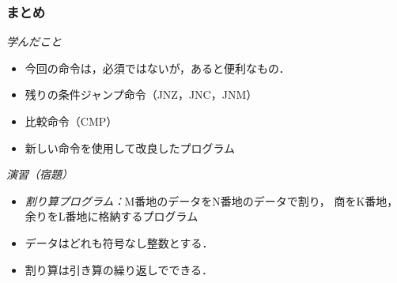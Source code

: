 \documentclass[handout]{beamer}        %
\begin{document}
\begin{frame}
  \frametitle{まとめ}
  \emph{学んだこと}
  \begin{itemize}
  \item 今回の命令は，必須ではないが，あると便利なもの．
  \item 残りの条件ジャンプ命令（JNZ，JNC，JNM）
  \item 比較命令（CMP）
  \item 新しい命令を使用して改良したプログラム
  \end{itemize}
  \vfill

  \emph{演習（宿題）}
  \begin{itemize}
  \item \emph{割り算プログラム：}M番地のデータをN番地のデータで割り，
    商をK番地，余りをL番地に格納するプログラム
  \item データはどれも符号なし整数とする．
  \item 割り算は引き算の繰り返しでできる．
  \end{itemize}
  \vfill
\end{frame}
\end{document}
